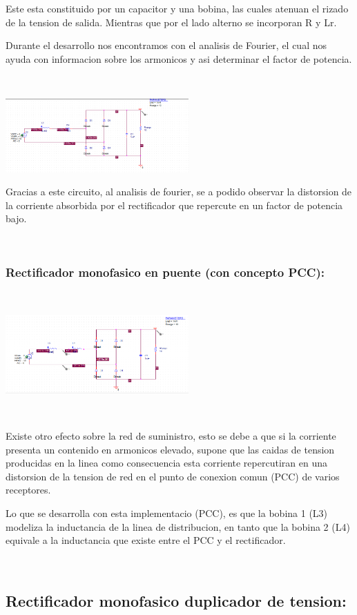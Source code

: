\documentclass[12pt,letterpaper]{article}
\begin{document}
Este esta constituido por un capacitor y una bobina, las cuales atenuan el rizado de la tension de salida. Mientras que por el lado alterno se incorporan R y Lr.
\

Durante el desarrollo nos encontramos con el analisis de Fourier, el cual nos ayuda con informacion sobre los armonicos y asi determinar el factor de potencia.

\

\includegraphics[width=7cm]{Circuito 1-3.png} 
\

Gracias a este circuito, al analisis de fourier, se a podido observar la distorsion de la corriente absorbida por el rectificador que repercute en un factor de potencia bajo.

\

\subsubsection{Rectificador monofasico en puente (con concepto PCC):}
\

\includegraphics[width=7cm]{Circuito 1-3-2.png} 

\

Existe otro efecto sobre la red de suministro, esto se debe a que si la corriente presenta un contenido en armonicos elevado, supone que las caidas de tension producidas en la linea como consecuencia esta corriente repercutiran en una distorsion de la tension de red en el punto de conexion comun (PCC) de varios receptores.
\

Lo que se desarrolla con esta implementacio (PCC), es que la bobina 1 (L3) modeliza la inductancia de la linea de distribucion, en tanto que la bobina 2 (L4) equivale a la inductancia que existe entre el PCC y el rectificador.

\

\subsection{Rectificador monofasico duplicador de tension:}
\
\end{document}
